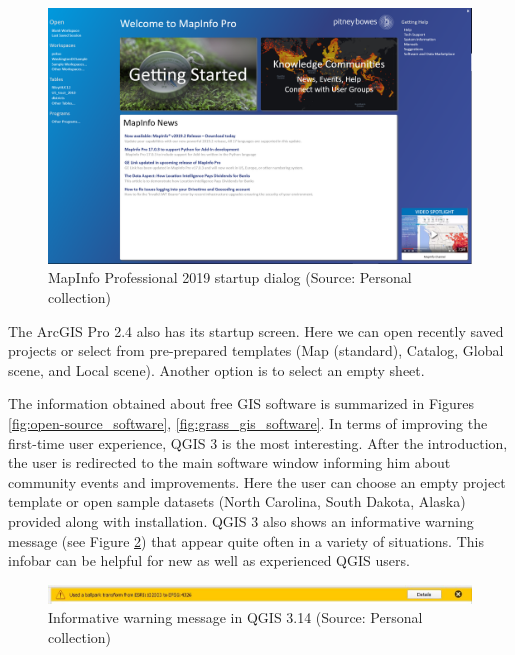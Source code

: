 \documentclass[a4paper,10pt,twoside]{article}
\begin{document}
\vspace{0.3cm}
\begin{figure}[hbt!] 
\begin{center}
\includegraphics[width=16cm]{../pictures/map_info_startup_screen.PNG} 
\caption[MapInfo Professional 2019 startup dialog]{MapInfo Professional 2019 startup dialog (Source: Personal collection)}
\label{fig:map_info_startup_screen}
\end{center}
\end{figure}

\noindent The ArcGIS Pro 2.4 also has its startup screen. Here we can
open recently saved projects or select from pre-prepared templates
(Map (standard), Catalog, Global scene, and Local scene). Another
option is to select an empty sheet.

The information obtained about free GIS software is summarized
in Figures \ref{fig:open-source_software}, \ref{fig:grass_gis_software}. 
In terms of improving the
first-time user experience, QGIS 3 is the most interesting. After the
introduction, the user is redirected to the main software window
informing him about community events and improvements. Here the user
can choose an empty project template or open sample datasets (North
Carolina, South Dakota, Alaska) provided along with installation. QGIS
3 also shows an informative warning message (see Figure
\ref{fig:qgis_warning_window}) that appear quite often in a variety of
situations. This infobar can be helpful for new as well as experienced
QGIS users.

\vspace{0.3cm}
\begin{figure}[hbt!] 
\begin{center}
\includegraphics[width=17cm]{../pictures/qgis_warning_window.JPG} 
\caption[Informative warning message  in QGIS 3.14]{Informative warning message  in QGIS 3.14 (Source: Personal collection)}
\label{fig:qgis_warning_window}
\end{center}
\end{figure}
\end{document}
